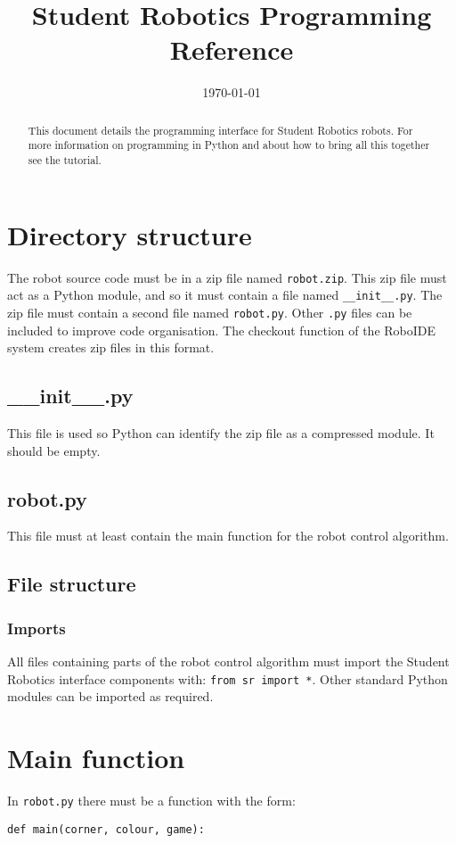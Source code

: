 \documentclass{article}
\begin{document}
\title{Student Robotics Programming Reference}
\date{\today}
\maketitle
\begin{abstract}
This document details the programming interface for Student Robotics
robots.  For more information on programming in Python and about how
to bring all this together see the tutorial. 
\end{abstract}
\section{Directory structure}
The robot source code must be in a zip file named \texttt{robot.zip}.
This zip file must act as a Python module, and so it must contain a
file named \texttt{\_\_init\_\_.py}.  The zip file must contain a
second file named \texttt{robot.py}.  Other \texttt{.py} files can be 
included to improve code organisation.  The checkout function of the
RoboIDE system creates zip files in this format. 

\subsection{\_\_init\_\_.py}
This file is used so Python can identify the zip file as a compressed module.
It should be empty.
\subsection{robot.py}
This file must at least contain the main function for the robot control
algorithm.
\subsection{File structure}
\subsubsection{Imports}
All files containing parts of the robot control algorithm must import the Student
Robotics interface components with: \texttt{from sr import *}.  Other standard
Python modules can be imported as required.
\section{Main function}
In \texttt{robot.py} there must be a function with the form:

\begin{verbatim}
def main(corner, colour, game):
\end{verbatim}
\end{document}
